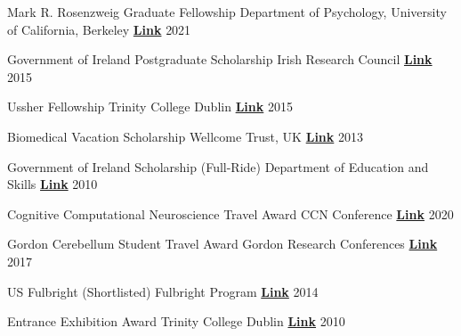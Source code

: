 

\begin{cvhonors}

 \cvhonor
    {Mark R. Rosenzweig Graduate Fellowship} %
    {Department of Psychology, University of California, Berkeley}
    {\href{https://psychology.berkeley.edu/give/endowed-funds}{\textbf{Link}}}
  	{2021}

 \cvhonor
   {Government of Ireland Postgraduate Scholarship}
   {Irish Research Council}
   {\href{https://research.ie/funding/goipg/}{\textbf{Link}}}
   {2015}
   
 \cvhonor
   {Ussher Fellowship}
   {Trinity College Dublin}
   {\href{https://www.tcd.ie/study/international/scholarships/Postgraduate/ussher.php}{\textbf{Link}}}
   {2015}

  \cvhonor
   {Biomedical Vacation Scholarship}
   {Wellcome Trust, UK}
   {\href{https://wellcome.org/}{\textbf{Link}}}
   {2013}

  \cvhonor
   {Government of Ireland Scholarship (Full-Ride)}
   {Department of Education and Skills}
   {\href{https://www.gov.ie/en/service/third-level-scholarships/}{\textbf{Link}}}
   {2010}
   
\end{cvhonors}


\begin{cvhonors}
  
 \cvhonor
   {Cognitive Computational Neuroscience Travel Award}
   {CCN Conference}
   {\href{https://2021.ccneuro.org/index.php}{\textbf{Link}}}
   {2020}
   
 \cvhonor
   {Gordon Cerebellum Student Travel Award}
   {Gordon Research Conferences}
   {\href{https://www.grc.org/cerebellum-grs-conference/2017/}{\textbf{Link}}}
   {2017}
     
 \cvhonor
   {US Fulbright (Shortlisted)}
   {Fulbright Program}
   {\href{https://www.fulbright.ie/going-to-the-usa/fulbright-irish-scholar-awards/}{\textbf{Link}}}
   {2014}
   
  \cvhonor
   {Entrance Exhibition Award}
   {Trinity College Dublin}
   {\href{https://www.tcd.ie/study/undergraduate/entrance-exhibition/}{\textbf{Link}}}
   {2010}
 
\end{cvhonors}

